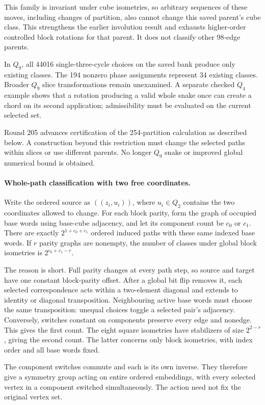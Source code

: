 \documentclass[11pt,a4paper]{article}
\begin{document}
This family is invariant under cube isometries, so arbitrary sequences
of these moves, including changes of partition, also cannot change
this saved parent's cube class. This strengthens the earlier
involution result and exhausts higher-order controlled block rotations
for that parent. It does not classify other 98-edge parents.

In $Q_9$, all 44016 single-three-cycle choices on the saved bank
produce only existing classes. The 194 nonzero phase assignments
represent 34 existing classes. Broader $Q_9$ slice transformations
remain unexamined. A separate checked $Q_4$ example shows that a
rotation producing a valid whole snake once can create a chord on
its second application; admissibility must be evaluated on the
current selected set.

Round 205 advances certification of the 254-partition calculation
as described below. A construction beyond this restriction must
change the selected paths within slices or use different parents.
No longer $Q_9$ snake or improved global numerical bound is obtained.

\paragraph{Whole-path classification with two free coordinates.}
Write the ordered source as $((z_i,u_i))$, where $u_i\in Q_2$
contains the two coordinates allowed to change. For each block
parity, form the graph of occupied base words using base-cube
adjacency, and let its component count be $c_0$ or $c_1$.
There are exactly $2^{1+c_0+c_1}$ ordered induced paths with
these same indexed base words. If $r$ parity graphs are nonempty,
the number of classes under global block isometries is
$2^{c_0+c_1-r}$.

The reason is short. Full parity changes at every path step,
so source and target have one constant block-parity offset.
After a global bit flip removes it, each selected correspondence
acts within a two-element diagonal and extends to identity or
diagonal transposition. Neighbouring active base words must choose
the same transposition: unequal choices toggle a selected pair's
adjacency. Conversely, switches constant on components preserve
every edge and nonedge. This gives the first count. The eight
square isometries have stabilizers of size $2^{2-r}$, giving the
second count. The latter concerns only block isometries, with
index order and all base words fixed.

The component switches commute and each is its own inverse.
They therefore give a symmetry group acting on entire ordered
embeddings, with every selected vertex in a component switched
simultaneously. The action need not fix the original vertex set.
\end{document}

